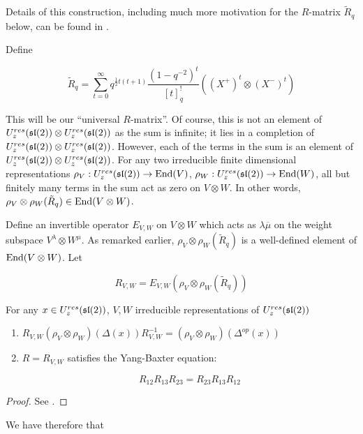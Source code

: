 Details of this construction, including much more motivation for the $R$-matrix
$\tilde{R}_q$ below, can be found in \cite{CP}.


Define 

\begin{equation}
\tilde{R}_q = \sum_{t=0}^\infty q^{\frac{1}{2} t(t+1)} \frac{(1-q^{-2})^t}{[t]_q^{!}} ((X^+)^t \otimes (X^-)^t)
\end{equation}

This will be our ``universal $R$-matrix''. Of course, this is not an element of
$U_z^{res}(\mathfrak{sl}(2)) \otimes U_z^{res}(\mathfrak{sl}(2))$ as the sum is infinite; it lies in a
completion of $U_z^{res}(\mathfrak{sl}(2)) \otimes U_z^{res}(\mathfrak{sl}(2))$. However, each of the terms
in the sum is an element of $U_z^{res}(\mathfrak{sl}(2)) \otimes U_z^{res}(\mathfrak{sl}(2))$. For any
two irreducible finite dimensional representations $\rho_V : U_z^{res}(\mathfrak{sl}(2)) \to
\operatorname{End}(V)$, $\rho_W : U_z^{res}(\mathfrak{sl}(2)) \to \operatorname{End}(W)$, all but finitely many terms in the
sum act as zero on $V \otimes W$. In other words, $\rho_V \otimes \rho_W
(\tilde{R}_q) \in \operatorname{End}(V \otimes W)$. 

Define an invertible operator $E_{V,W}$ on $V \otimes W$ which acts as
$\lambda\overline{\mu}$ on the weight subspace $V^\lambda \otimes W^\mu$. As remarked
earlier, $\rho_V \otimes \rho_W (\tilde{R}_q) $ is a well-defined element of
$\operatorname{End}(V \otimes W)$. Let 

\begin{equation}
R_{V,W} = E_{V,W} \left(\rho_V \otimes \rho_W (\tilde{R}_q)\right)
\end{equation}

\begin{claim}
For any $x \in U_z^{res}(\mathfrak{sl}(2))$, $V,W$ irreducible representations of $U_z^{res}(\mathfrak{sl}(2))$
\begin{enumerate}
\item $R_{V,W} (\rho_V \otimes \rho_W) (\Delta(x)) R^{-1}_{V,W} = (\rho_{V} \otimes \rho_W)(\Delta^{op}(x))$
\item $R=R_{V,W}$  satisfies the Yang-Baxter equation: 

\begin{equation}
R_{12} R_{13} R_{23} = R_{23} R_{13} R_{12}
\end{equation}
\end{enumerate}
\end{claim}
\begin{proof}
    See \cite{CP}.
\end{proof}

We have therefore that 

